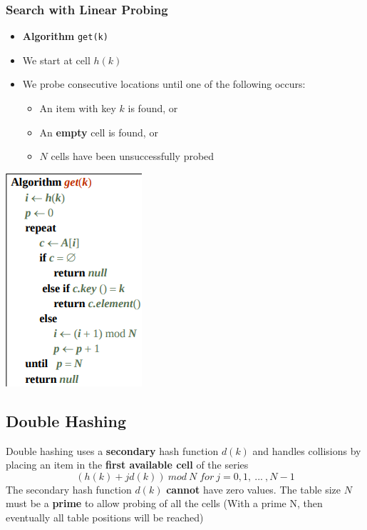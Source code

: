 \documentclass{article}
\begin{document}
\subsubsection{Search with Linear Probing}
\begin{multicols}{2}
\begin{itemize}
	\item \textbf{Algorithm} \texttt{get(k)}
	\item We start at cell $h(k)$
	\item We probe consecutive locations until one of the following occurs:
	\begin{itemize}
		\item An item with key $k$ is found, or
		\item An \textbf{empty} cell is found, or
		\item $N$ cells have been unsuccessfully probed
	\end{itemize}
\end{itemize}

\includegraphics[scale=0.5]{get_open_addressing.png}
\end{multicols}

\subsection{Double Hashing}
\begin{flushleft}
Double hashing uses a \textbf{secondary} hash function $d(k)$ and handles collisions by placing an item in the \textbf{first available cell} of the series
	\[ (h(k) + j d(k)) \: mod \: N \; for  \: j = 0, 1, \: \textrm{...} \: , N - 1 \]
The secondary hash function $d(k)$ \textbf{cannot} have zero values. The table size $N$ must be a \textbf{prime} to allow probing of all the cells (With a prime N, then eventually all table positions will be reached)
\end{flushleft}
\end{document}
